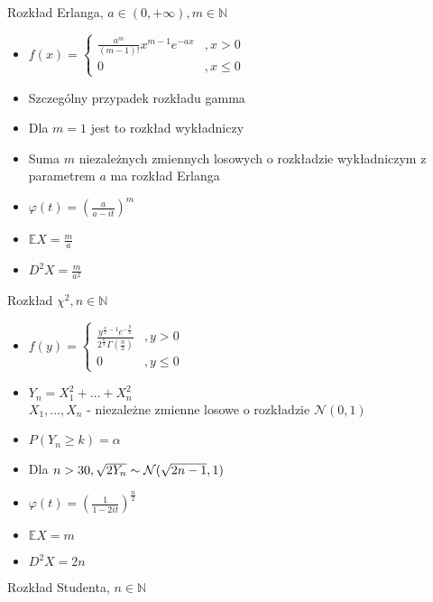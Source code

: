 \documentclass[a4paper,12pt]{report}
\theoremstyle{break}
\theoremstyle{definition}
\theoremstyle{defi}
\theoremstyle{break}
\theoremstyle{defi}
\begin{document}
{\Large Rozkład Erlanga, $ a\in (0,+\infty ),m\in \mathbb{N} $}
\begin{multicols}{2}
\begin{itemize}
\item $ f(x)=
\left \{
\begin{array}{ll}
\frac{a^m}{\left(m-1\right)!}x^{m-1}e^{-ax}&,x>0\\
0&,x\le0
\end{array}
\right . $
\item Szczególny przypadek rozkładu gamma
\item Dla $ m=1 $ jest to rozkład wykładniczy
\columnbreak
\item Suma $ m $ niezależnych zmiennych losowych o rozkładzie wykładniczym z parametrem $ a $ ma rozkład Erlanga
\item $ \varphi(t)=\left(\frac{a}{a-it}\right)^m $
\item $ \mathbb E X=\frac{m}{a} $
\item $ D^2X=\frac{m}{a^2} $
\end{itemize}
\end{multicols}
{\Large Rozkład $ \chi^2 ,n\in \mathbb N $}
\begin{multicols}{2}
\begin{itemize}
\item $ f(y)=
\left \{
\begin{array}{ll}
\frac{y^{\frac{n}{2}-1}e^{-\frac{y}{2}}}{2^{\frac{n}{2}}\Gamma\left(\frac{n}{2}\right)}&,y>0\\
0&,y\le0
\end{array}
\right . $
\item $ Y_n=X_1^2+\dots+X_n^2 $\\
$ X_1,\dots,X_n$ - niezależne zmienne losowe o rozkładzie $ \mathcal N(0,1) $ 
\item $ P(Y_n\ge k)=\alpha $
\item Dla $ n>30,\\
 \sqrt{2Y_n}\sim\mathcal N(\sqrt{2n-1},1) $
 \item $ \varphi(t)=\left(\frac{1}{1-2it}\right)^{\frac{n}{2}} $
 \item $ \mathbb E X=m $
 \item $ D^2X=2n $
\end{itemize}
\end{multicols}
\newpage
{\Large Rozkład Studenta, $ n\in \mathbb N  $}
\end{document}
